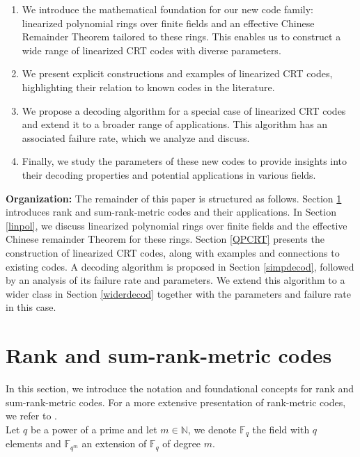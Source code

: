 \documentclass{article}
\theoremstyle{definition}
\begin{document}
\begin{enumerate}
      \item We introduce the mathematical foundation for our new code family: linearized polynomial rings over finite fields and an effective Chinese \\Remainder Theorem tailored to these rings. This enables us to construct a wide range of linearized CRT codes with diverse parameters.
      \item We present explicit constructions and examples of linearized CRT codes, highlighting their relation to known codes in the literature.
      \item We propose a decoding algorithm for a special case of linearized CRT codes and extend it to a broader range of applications. This algorithm has an associated failure rate, which we analyze and discuss.
      \item Finally, we study the parameters of these new codes to provide insights into their decoding properties and potential applications in various fields.
\end{enumerate}

\textbf{Organization:} The remainder of this paper is structured as follows. Section \ref{introrank} introduces rank and sum-rank-metric codes and their applications. In Section \ref{linpol}, we discuss linearized polynomial rings over finite fields and the effective Chinese remainder Theorem for these rings. Section \ref{QPCRT} presents the construction of linearized CRT codes, along with examples and connections to existing codes. A decoding algorithm is proposed in Section \ref{simpdecod}, followed by an analysis of its failure rate and parameters. We extend this algorithm to a wider class in Section \ref{widerdecod} together with the parameters and failure rate in this case.

\section{Rank and sum-rank-metric codes} \label{introrank}

In this section, we introduce the notation and foundational concepts for rank and sum-rank-metric codes. For a more extensive presentation of rank-metric codes, we refer to \cite{bartz_rank-metric_2022}.\\

\noindent Let $q$ be a power of a prime and let $m \in \mathbb{N}$, we denote
$\mathbb{F}_q$ the field with $q$ elements and $\mathbb{F}_{q^m}$ an extension
of $\mathbb{F}_q$ of degree $m$.
\end{document}
